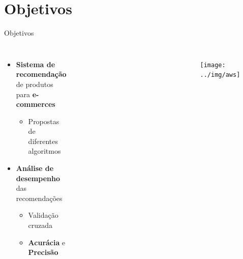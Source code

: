 \section[Objetivos]{Objetivos}
\begin{frame}{Objetivos}
\begin{columns}[c] 
\begin{itemize}
	\item \textbf{Sistema de recomendação} de produtos para \textbf{e-commerces}
	\begin{itemize}
		\item Propostas de diferentes algoritmos
	\end{itemize}
	\item \textbf{Análise de desempenho} das recomendações
	\begin{itemize}
		\item Validação cruzada
		\item \textbf{Acurácia} e \textbf{Precisão} 
	\end{itemize}
\end{itemize}

\begin{figure}[ht]
    \begin{center}
    \includegraphics[width=0.5\textwidth]{img/r}
    \end{center}
\end{figure}

\begin{figure}[ht]
    \begin{center}
    \includegraphics[width=1\textwidth]{img/movielens}
    \end{center}
\end{figure}

\begin{figure}[ht]
    \begin{center}
    \texttt{[image: ../img/aws]}
    \end{center}
\end{figure}

\end{columns}
\end{frame}
